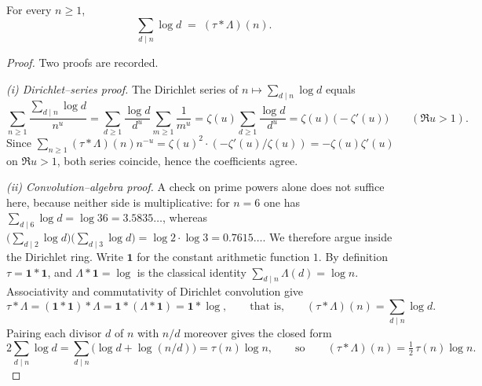 \begin{lemma}\label{lem:divlog}
For every $n\ge1$,
\[
\sum_{d\mid n}\log d \;=\; (\tau*\Lambda)(n).
\]
\end{lemma}
\begin{proof}
Two proofs are recorded.

\emph{(i) Dirichlet–series proof.} The Dirichlet series of $n\mapsto \sum_{d\mid n}\log d$ equals
\[
\sum_{n\ge1}\frac{\sum_{d\mid n}\log d}{n^u}
=\sum_{d\ge1}\frac{\log d}{d^{u}}\sum_{m\ge1}\frac{1}{m^{u}}
=\zeta(u)\sum_{d\ge1}\frac{\log d}{d^{u}}
=\zeta(u)\,\bigl(-\zeta'(u)\bigr)\qquad(\Re u>1).
\]
Since $\sum_{n\ge1}(\tau*\Lambda)(n)n^{-u}=\zeta(u)^2\cdot(-\zeta'(u)/\zeta(u))=-\zeta(u)\zeta'(u)$ on $\Re u>1$, both series coincide, hence the coefficients agree.

\emph{(ii) Convolution–algebra proof.} A check on prime powers alone does not suffice here, because neither side is multiplicative: for $n=6$ one has $\sum_{d\mid6}\log d=\log 36=3.5835\ldots$, whereas $\bigl(\sum_{d\mid2}\log d\bigr)\bigl(\sum_{d\mid3}\log d\bigr)=\log2\cdot\log3=0.7615\ldots$. We therefore argue inside the Dirichlet ring. Write $\mathbf 1$ for the constant arithmetic function $1$. By definition $\tau=\mathbf 1*\mathbf 1$, and $\Lambda*\mathbf 1=\log$ is the classical identity $\sum_{d\mid n}\Lambda(d)=\log n$. Associativity and commutativity of Dirichlet convolution give
\[
\tau*\Lambda=(\mathbf 1*\mathbf 1)*\Lambda=\mathbf 1*(\Lambda*\mathbf 1)=\mathbf 1*\log,
\qquad\text{that is,}\qquad
(\tau*\Lambda)(n)=\sum_{d\mid n}\log d .
\]
Pairing each divisor $d$ of $n$ with $n/d$ moreover gives the closed form
\[
2\sum_{d\mid n}\log d=\sum_{d\mid n}\bigl(\log d+\log(n/d)\bigr)=\tau(n)\log n,
\qquad\text{so}\qquad
(\tau*\Lambda)(n)=\tfrac12\,\tau(n)\log n .
\]
\end{proof}

